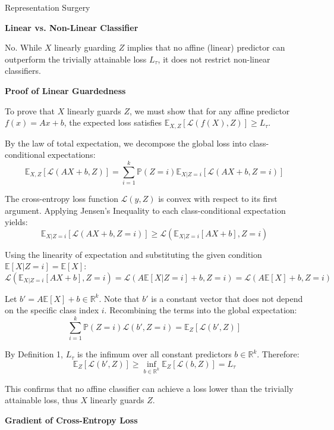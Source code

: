 \begin{question}{Representation Surgery}

\begin{subquestion}{\textbf{Linear vs. Non-Linear Classifier}}

No. While $X$ linearly guarding $Z$ implies that no affine (linear) predictor can outperform the trivially attainable loss $L_{\tau}$, it does not restrict non-linear classifiers.
\end{subquestion}

\begin{subquestion}{\textbf{Proof of Linear Guardedness}}

To prove that $X$ linearly guards $Z$, we must show that for any affine predictor $f(x) = Ax + b$, the expected loss satisfies $\mathbb{E}_{X,Z}[\mathcal{L}(f(X), Z)] \ge L_{\tau}$.

By the law of total expectation, we decompose the global loss into class-conditional expectations:
$$\mathbb{E}_{X,Z}[\mathcal{L}(AX + b, Z)] = \sum_{i=1}^{k} \mathbb{P}(Z=i) \mathbb{E}_{X|Z=i} [\mathcal{L}(AX + b, Z=i)]$$

The cross-entropy loss function $\mathcal{L}(y, Z)$ is convex with respect to its first argument. Applying Jensen's Inequality to each class-conditional expectation yields:
$$\mathbb{E}_{X|Z=i} [\mathcal{L}(AX + b, Z=i)] \ge \mathcal{L}(\mathbb{E}_{X|Z=i}[AX + b], Z=i)$$

Using the linearity of expectation and substituting the given condition $\mathbb{E}[X|Z=i] = \mathbb{E}[X]$:
$$\mathcal{L}(\mathbb{E}_{X|Z=i}[AX + b], Z=i) = \mathcal{L}(A\mathbb{E}[X|Z=i] + b, Z=i) = \mathcal{L}(A\mathbb{E}[X] + b, Z=i)$$

Let $b' = A\mathbb{E}[X] + b \in \mathbb{R}^k$. Note that $b'$ is a constant vector that does not depend on the specific class index $i$. Recombining the terms into the global expectation:
$$\sum_{i=1}^{k} \mathbb{P}(Z=i) \mathcal{L}(b', Z=i) = \mathbb{E}_Z[\mathcal{L}(b', Z)]$$

By Definition 1, $L_{\tau}$ is the infimum over all constant predictors $b \in \mathbb{R}^k$. Therefore:
$$\mathbb{E}_Z[\mathcal{L}(b', Z)] \ge \inf_{b \in \mathbb{R}^k} \mathbb{E}_Z [\mathcal{L}(b, Z)] = L_{\tau}$$

This confirms that no affine classifier can achieve a loss lower than the trivially attainable loss, thus $X$ linearly guards $Z$.
\end{subquestion}

\begin{subquestion}{\textbf{Gradient of Cross-Entropy Loss}}


\end{subquestion}
\end{question}
